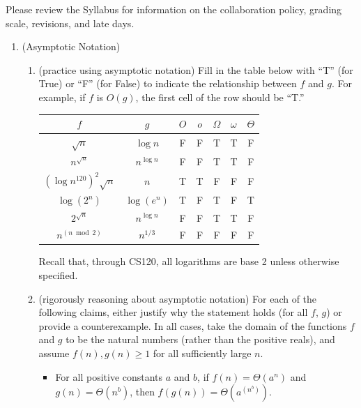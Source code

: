 \documentclass[11pt]{article}
\begin{document}

Please review the Syllabus for information on the collaboration policy, grading scale, revisions, and late days.


\begin{enumerate}
    \item (Asymptotic Notation) 
    \begin{enumerate}
    \item (practice using asymptotic notation)
        Fill in the table below with ``T'' (for True) or ``F'' (for False) to indicate the relationship between $f$ and $g$. For example, if $f$ is $O(g)$, the first cell of the row should be ``T.'' \\
        \begin{table}[h!]
        \centering
        \bgroup
        \def\arraystretch{1.3}
        \begin{tabular}{||c | c || c | c | c | c | c ||}
         \hline
         $f$ & $g$ & $O$ & $o$ & $\Omega$ & $\omega$ & $\Theta$ \\
         \hline\hline
         $\sqrt{n}$ & $\log n$ & F & F & T & T & F  \\ \hline
         $n^{\sqrt{n}}$ & $n^{\log n}$ & F & F & T & T & F \\ \hline
         $(\log {n^{120}})^2\sqrt{n}$ & $n$ & T & T & F & F & F \\ \hline
         $\log(2^n)$ & $\log(e^n)$ & T & F & T & F & T \\ \hline
         $2^{\sqrt{n}}$ & $n^{\log n}$ & F & F & T & T & F \\ \hline
         $n^{(n \bmod 2)}$ & $n^{1/3}$ & F & F & F & F & F \\ \hline
        \end{tabular}
        \egroup
        \end{table}
        Recall that, through CS120, all logarithms are base 2 unless otherwise specified. 
        
    \item  (rigorously reasoning about asymptotic notation)  
    For each of the following claims, either justify why the statement holds (for all $f$, $g$) or provide a counterexample. In all cases, take the domain of the functions $f$ and $g$ to be the natural numbers (rather than the positive reals), and assume $f(n), g(n)\geq 1$ for all sufficiently large $n$.
    \begin{itemize}
        \item For all positive constants $a$ and $b$, if $f(n) = \Theta(a^n)$ and $g(n) = \Theta(n^b)$, then $f(g(n)) = \Theta(a^{(n^b)})$.


\end{itemize}
\end{enumerate}
\end{enumerate}
\end{document}
